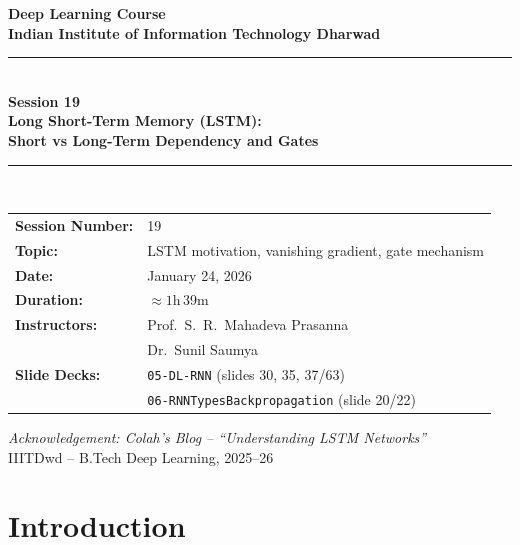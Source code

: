 \documentclass[12pt,a4paper]{article}
\begin{document}
\begin{titlepage}
  \centering
  \vspace*{2cm}
  {\LARGE\bfseries Deep Learning Course\\[0.4em]
   Indian Institute of Information Technology Dharwad\\[1.5em]}
  \rule{\linewidth}{1pt}\\[0.8em]
  {\huge\bfseries Session 19\\[0.5em]
   Long Short-Term Memory (LSTM):\\[0.3em]
   Short vs Long-Term Dependency and Gates}\\[0.8em]
  \rule{\linewidth}{1pt}\\[1.5em]
  \begin{tabular}{ll}
    \textbf{Session Number:} & 19 \\[0.4em]
    \textbf{Topic:}          & LSTM motivation, vanishing gradient, gate mechanism \\[0.4em]
    \textbf{Date:}           & January 24, 2026 \\[0.4em]
    \textbf{Duration:}       & $\approx 1$h\,39m \\[0.4em]
    \textbf{Instructors:}    & Prof.\ S.\ R.\ Mahadeva Prasanna \\
                             & Dr.\ Sunil Saumya \\[0.4em]
    \textbf{Slide Decks:}    & \texttt{05-DL-RNN} (slides 30, 35, 37/63) \\
                             & \texttt{06-RNNTypesBackpropagation} (slide 20/22) \\
  \end{tabular}
  \vfill
  {\large\itshape Acknowledgement: Colah's Blog --
   ``Understanding LSTM Networks''}\\[1em]
  {\large IIITDwd -- B.Tech Deep Learning, 2025--26}
\end{titlepage}

\tableofcontents
\newpage

\section{Introduction}
\label{sec:introduction}
\end{document}

